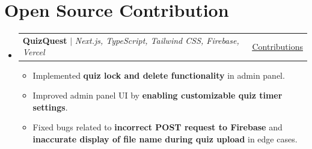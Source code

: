 \documentclass[a4paper,11pt]{article}
\makeatletter
\newcommand{\resumeItem}[1]{\item\small{#1 \vspace{-2pt}}}
\newcommand{\resumeProject}[3]{
    \item
    \begin{tabular*}{0.97\textwidth}{l@{\extracolsep{\fill}}r}
        \small#2 & \small\href{#1}{\underline{#3}} \\
    \end{tabular*}\vspace{-7pt}
}
\newcommand{\resumeSubHeadingListStart}{\begin{itemize}[leftmargin=0.15in, label={}]}
\newcommand{\resumeSubHeadingListEnd}{\end{itemize}}
\newcommand{\resumeItemListStart}{\begin{itemize}}
\newcommand{\resumeItemListEnd}{\end{itemize}\vspace{-5pt}}
\makeatother
\begin{document}
\section{Open Source Contribution}
\resumeSubHeadingListStart
    \resumeProject
        {https://github.com/SkySingh04/QuizQuest/commits?author=areebahmeddd}{\textbf{QuizQuest} $|$ \emph{Next.js, TypeScript, Tailwind CSS, Firebase, Vercel}}{Contributions}
        \resumeItemListStart
            \resumeItem{Implemented \textbf{quiz lock and delete functionality} in admin panel.}
            \resumeItem{Improved admin panel UI by \textbf{enabling customizable quiz timer settings}.}
            \resumeItem{Fixed bugs related to \textbf{incorrect POST request to Firebase} and \textbf{inaccurate display of file name during quiz upload} in edge cases.}
        \resumeItemListEnd
\resumeSubHeadingListEnd

\end{document}
